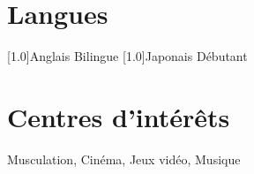 \documentclass[french]{cv-style}          %
\begin{document}
\section{Langues}
\begin{entrylist}
  \vspace{0.2cm}
  \entry
    {\scalebox{.8}[1.0]{Anglais}}
    {Bilingue}
    {}
    {}
  \entry
    {\scalebox{.8}[1.0]{Japonais}}
    {Débutant}
    {}
    {}
   
\end{entrylist}

\section{Centres d'intérêts}
\textbf{}{Musculation, Cinéma, Jeux vidéo, Musique}
\end{document}
